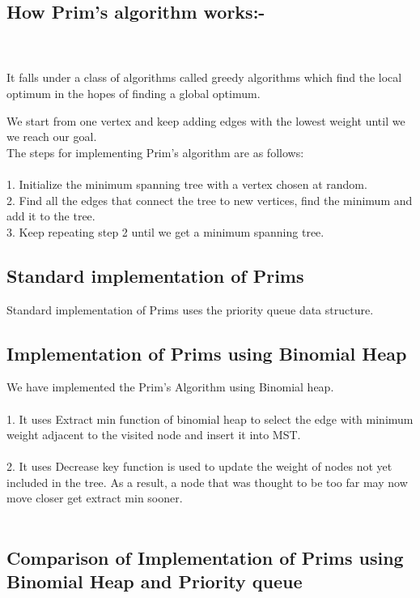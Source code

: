 \documentclass[10pt,a4paper]{article} ,
\begin{document}
\subsection*{How Prim's algorithm works:-}\\ \\ 
	It falls under a class of algorithms called greedy algorithms which find the local optimum in the hopes of finding a global optimum.

	We start from one vertex and keep adding edges with the lowest weight until we we reach our goal. \\

The steps for implementing Prim's algorithm are as follows:\\ \\

1. Initialize the minimum spanning tree with a vertex chosen at random.\\
2. Find all the edges that connect the tree to new vertices, find the minimum and add it to the tree.\\
3. Keep repeating step 2 until we get a minimum spanning tree.\\

\subsection*{Standard implementation of Prims}
	Standard implementation of Prims uses the priority queue data structure.
	
\subsection*{Implementation of Prims using Binomial Heap}
	We have implemented the Prim's Algorithm using Binomial heap.\\ \\
	1. It uses Extract min function of binomial heap to select the edge with minimum weight  adjacent to the visited node and insert it into MST. \\ \\
	2. It uses Decrease key function is used to update the weight of nodes not yet included in the tree. As a result, a node that was thought to be too far may now move closer get extract min sooner. \\ \\
	
	
\subsection*{Comparison of Implementation of Prims using Binomial Heap and Priority queue}
\end{document}
